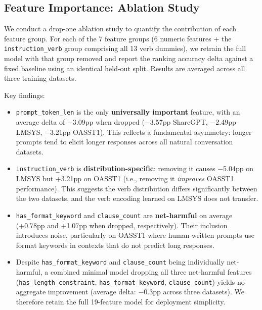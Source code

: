 \documentclass[10pt,letterpaper]{article}
\begin{document}
\subsection{Feature Importance: Ablation Study}

We conduct a drop-one ablation study to quantify the contribution of each feature group. For each of the 7 feature groups (6 numeric features + the \texttt{instruction\_verb} group comprising all 13 verb dummies), we retrain the full model with that group removed and report the ranking accuracy delta against a fixed baseline using an identical held-out split. Results are averaged across all three training datasets.

Key findings:

\begin{itemize}
  \item \texttt{prompt\_token\_len} is the only \textbf{universally important} feature, with an average delta of $-$3.09pp when dropped ($-$3.57pp ShareGPT, $-$2.49pp LMSYS, $-$3.21pp OASST1). This reflects a fundamental asymmetry: longer prompts tend to elicit longer responses across all natural conversation datasets.

  \item \texttt{instruction\_verb} is \textbf{distribution-specific}: removing it causes $-$5.04pp on LMSYS but +3.21pp on OASST1 (i.e., removing it \textit{improves} OASST1 performance). This suggests the verb distribution differs significantly between the two datasets, and the verb encoding learned on LMSYS does not transfer.

  \item \texttt{has\_format\_keyword} and \texttt{clause\_count} are \textbf{net-harmful} on average (+0.78pp and +1.07pp when dropped, respectively). Their inclusion introduces noise, particularly on OASST1 where human-written prompts use format keywords in contexts that do not predict long responses.

  \item Despite \texttt{has\_format\_keyword} and \texttt{clause\_count} being individually net-harmful, a combined minimal model dropping all three net-harmful features (\texttt{has\_length\_constraint}, \texttt{has\_format\_keyword}, \texttt{clause\_count}) yields no aggregate improvement (average delta: $-$0.3pp across three datasets). We therefore retain the full 19-feature model for deployment simplicity.
\end{itemize}
\end{document}
